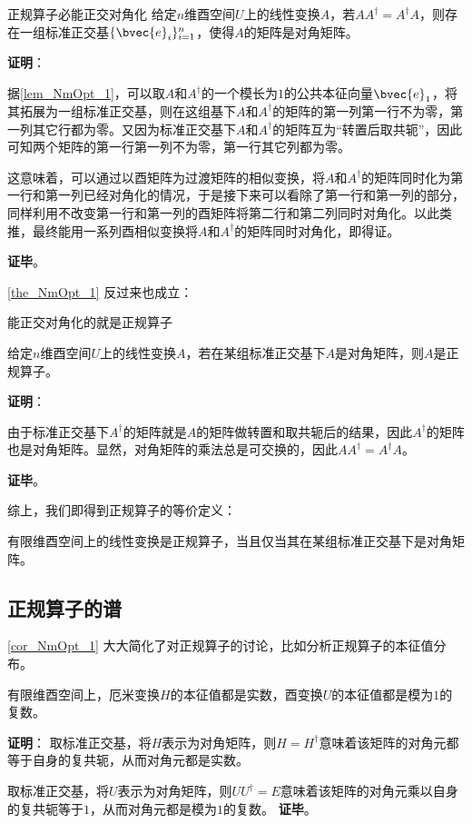 \begin{theorem}{正规算子必能正交对角化}\label{the_NmOpt_1}
给定$n$维酉空间$U$上的线性变换$A$，若$AA^\dagger = A^\dagger A$，则存在一组标准正交基$\{\bvec{e}_i\}_{i=1}^n$，使得$A$的矩阵是对角矩阵。
\end{theorem}

\textbf{证明}：

据\autoref{lem_NmOpt_1}，可以取$A$和$A^\dagger$的一个模长为$1$的公共本征向量$\bvec{e}_1$，将其拓展为一组标准正交基，则在这组基下$A$和$A^\dagger$的矩阵的第一列第一行不为零，第一列其它行都为零。又因为标准正交基下$A$和$A^\dagger$的矩阵互为“转置后取共轭”，因此可知两个矩阵的第一行第一列不为零，第一行其它列都为零。

这意味着，可以通过以酉矩阵为过渡矩阵的相似变换，将$A$和$A^\dagger$的矩阵同时化为第一行和第一列已经对角化的情况，于是接下来可以看除了第一行和第一列的部分，同样利用不改变第一行和第一列的酉矩阵将第二行和第二列同时对角化。以此类推，最终能用一系列酉相似变换将$A$和$A^\dagger$的矩阵同时对角化，即得证。

\textbf{证毕}。


\autoref{the_NmOpt_1} 反过来也成立：


\begin{theorem}{能正交对角化的就是正规算子}

给定$n$维酉空间$U$上的线性变换$A$，若在某组标准正交基下$A$是对角矩阵，则$A$是正规算子。

\end{theorem}

\textbf{证明}：

由于标准正交基下$A^\dagger$的矩阵就是$A$的矩阵做转置和取共轭后的结果，因此$A^\dagger$的矩阵也是对角矩阵。显然，对角矩阵的乘法总是可交换的，因此$AA^\dagger = A^\dagger A$。

\textbf{证毕}。


综上，我们即得到正规算子的等价定义：


\begin{corollary}{}
有限维酉空间上的线性变换是正规算子，当且仅当其在某组标准正交基下是对角矩阵。
\end{corollary}

\subsection{正规算子的谱}
\autoref{cor_NmOpt_1} 大大简化了对正规算子的讨论，比如分析正规算子的本征值分布。

\begin{theorem}{}
有限维酉空间上，厄米变换$H$的本征值都是实数，酉变换$U$的本征值都是模为$1$的复数。
\end{theorem}

\textbf{证明}：
取标准正交基，将$H$表示为对角矩阵，则$H=H^\dagger$意味着该矩阵的对角元都等于自身的复共轭，从而对角元都是实数。

取标准正交基，将$U$表示为对角矩阵，则$UU^\dagger = E$意味着该矩阵的对角元乘以自身的复共轭等于$1$，从而对角元都是模为$1$的复数。
\textbf{证毕}。
